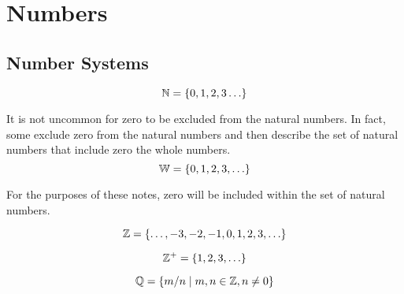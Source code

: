 \documentclass[20150903-160354-rs2.2-MarksMathNotebook.tex]{subfiles}
\begin{document}
%
%

\chapter{Numbers}



\section{Number Systems}

\begin{definition}

\[
\mathbb{N}=\left\{0, 1, 2, 3 \ldots\right\}
\]

\end{definition}

\begin{remark}
It is not uncommon for zero to be excluded from the natural numbers.  In fact, some exclude zero from the natural numbers and then describe the set of natural numbers that include zero the whole numbers. \\

\[
\mathbb{W}=\left\{0, 1, 2, 3, \ldots\right\}
\]

For the purposes of these notes, zero will be included within the set of natural numbers.
\end{remark}

\begin{definition}[Integers]

\[
\mathbb{Z}=\left\{\ldots, -3, -2, -1, 0, 1, 2, 3, \ldots\right\}
\]

\end{definition}

\begin{definition}

\[
\mathbb{Z}^{+}=\left\{1, 2, 3, \ldots\right\}
\]
\end{definition}

\begin{definition}

\[
\mathbb{Q}=\set{m/n \suchthat m,n \in \mathbb{Z}, n \ne 0}
\]
\end{definition}
\end{document}
